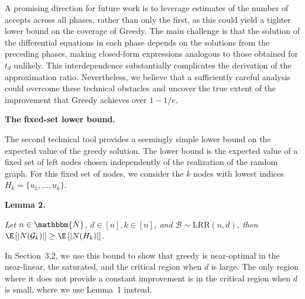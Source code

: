 A promising direction for future work is to leverage estimates of the number of accepts across all phases, rather than only the first, as this could yield a tighter lower bound on the coverage of Greedy.
The main challenge is that the solution of the differential equations in each phase depends on the solutions from the preceding phases, making closed-form expressions analogous to those obtained for $t_{d}$ unlikely. This interdependence substantially complicates the derivation of the approximation ratio.
Nevertheless, we believe that a sufficiently careful analysis could overcome these technical obstacles and uncover the true extent of the improvement that Greedy achieves over $1-1/e$.\par





\par\medskip\noindent\textbf{The fixed-set lower bound.}\par




The second technical tool provides a seemingly simple lower bound on the expected value of the greedy solution. The lower bound is the expected value of a fixed set of left nodes chosen independently of the realization of the random graph. For this fixed set of nodes, we consider the $k$ nodes with lowest indices $H_{k}=\{u_{1},\dots,u_{k}\}$.\par





\par\medskip\noindent\textbf{\textbf{Lemma 2}\textbf{.}}\par



\emph{Let $n\in\mathbbm{N}$, $d\in[n],k\in[n]$, and $\mathcal{B}\sim\text{{LRR}}(n,d)$, then $\E\left[|N(\mathcal{G}_{k})|\right]\geq\E\left[|N(H_{k})|\right]$.}\par






In Section 3.2, we use this bound to show that greedy is near-optimal in the near-linear, the saturated, and the critical region when $d$ is large.
The only region where it does not provide a constant improvement is in the critical region when $d$ is small, where we use Lemma 1 instead.\par




